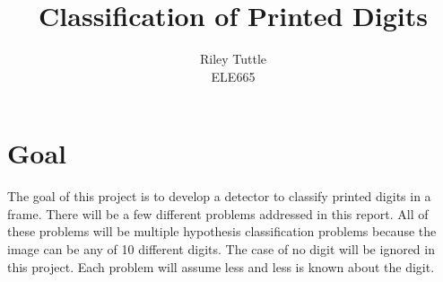 \documentclass[12pt]{article}
\begin{document}
\title{Classification of Printed Digits}
\author{Riley Tuttle\\
ELE665}
\renewcommand{\today}{May 3, 2017}
\maketitle
\section {Goal}
	The goal of this project is to develop a detector to classify printed digits in a frame.
	There will be a few different problems addressed in this report.
	All of these problems will be multiple hypothesis classification problems because the 		image can be any of 10 different digits.
	The case of no digit will be ignored in this project.
	Each problem will assume less and less is known about the digit.
\end{document}
